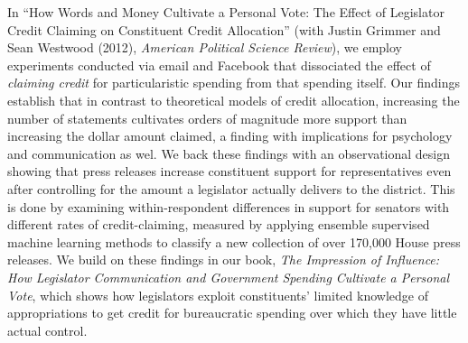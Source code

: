 \documentclass[12pt]{article}
\begin{document}
In ``How Words and Money Cultivate a Personal Vote: The Effect of Legislator Credit Claiming on Constituent Credit Allocation'' (with Justin Grimmer and Sean Westwood (2012), \emph{American Political Science Review}), we employ experiments conducted via email and Facebook that dissociated the effect of \emph{claiming credit} for particularistic spending from that spending itself.  Our findings establish that in contrast to theoretical models of credit allocation, increasing the number of statements cultivates orders of magnitude more support than increasing the dollar amount claimed, a finding with implications for psychology and communication as wel.  We back these findings with an observational design showing that press releases increase constituent support for representatives even after controlling for the amount a legislator actually delivers to the district.  This is done by examining within-respondent differences in support for senators with different rates of credit-claiming, measured by applying ensemble supervised machine learning methods to classify a new collection of over 170,000 House press releases.  We build on these findings in our book, \emph{The Impression of Influence: How Legislator Communication and Government Spending Cultivate a Personal Vote}, which shows how legislators exploit constituents' limited knowledge of appropriations to get credit for bureaucratic spending over which they have little actual control.  

\end{document}
